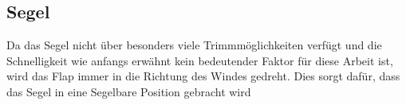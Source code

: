 \subsection{Segel}
Da das Segel nicht über besonders viele Trimmmöglichkeiten verfügt und die Schnelligkeit wie anfangs erwähnt kein bedeutender Faktor für diese Arbeit ist, wird das Flap immer in die Richtung des Windes gedreht. Dies sorgt dafür, dass das Segel in eine Segelbare Position gebracht wird 


 







